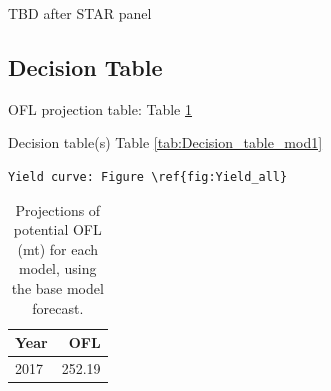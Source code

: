 \documentclass[12pt,]{article}
\begin{document}
TBD after STAR panel

\FloatBarrier

\subsection*{Decision Table}\label{decision-table}

OFL projection table: Table \ref{tab:OFL_projection}

Decision table(s) Table \ref{tab:Decision_table_mod1}

\begin{verbatim}
Yield curve: Figure \ref{fig:Yield_all}
\end{verbatim}

\begin{table}[ht]
\centering
\caption{Projections of potential OFL (mt) for 
                                        each model, using the base model forecast.} 
\label{tab:OFL_projection}
\begin{tabular}{lr}
  \hline
Year & OFL \\ 
  \hline
2017 & 252.19 \\ 
   \hline
\end{tabular}
\end{table}\begin{table}[ht]
\centering
\caption{Summary of 10-year 
                                             projections beginning in 2018 
                                             for alternate states of nature based on 
                                             an axis of uncertainty for the base model.  Columns range over low, mid, and high
                                             states of nature, and rows range over different 
                                             assumptions of catch levels. An entry of "--" 
                                             indicates that the stock is driven to very low 
                                             abundance under the particular scenario.} 
\label{tab:Decision_table_mod1}
\end{table}
\end{document}
